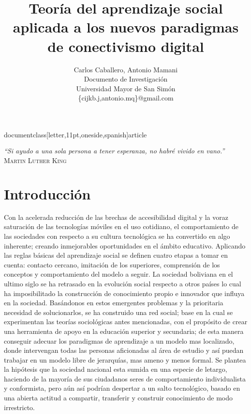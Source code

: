 documentclass[letter,11pt,oneside,spanish]{article}
\usepackage[latin1]{inputenc}
\usepackage[spanish]{babel}
\usepackage{graphicx}
\usepackage{float}
\usepackage{hyperref}
\usepackage{anysize}
\renewcommand{\rmdefault}{phv} %
\renewcommand{\sfdefault}{phv} %

\marginsize{2.5cm}{2.5cm}{2.5cm}{2.5cm}
\renewcommand{\baselinestretch}{1.5}


\title{\textbf{Teor\'ia del aprendizaje social aplicada a los nuevos paradigmas de conectivismo digital}}
\author{Carlos Caballero, Antonio Mamani\\
        Documento de Investigaci\'on\\
        Universidad Mayor de San Sim\'on\\
	\{cijkb.j,antonio.mq\}@gmail.com\\}
\date{}


\newpage
\thispagestyle{empty}
\begin{flushright}
\textit{``Si ayudo a una sola persona a tener esperanza, no habr\'e vivido en vano.''}\\
\textsc{Martin Luther King}
\end{flushright}


\newpage
\section{Introducci\'on}
Con la acelerada reducci\'on de las brechas de accesibilidad digital y la voraz saturaci\'on de las tecnolog\'ias m\'oviles en el
uso cotidiano, el comportamiento de las sociedades con respecto a su cultura tecnol\'ogica se ha convertido en algo inherente;
creando inmejorables oportunidades en el \'ambito educativo. Aplicando las reglas b\'asicas del aprendizaje social se definen 
cuatro etapas a tomar en cuenta: contacto cercano, imitaci\'on de los superiores, comprensi\'on de los conceptos y comportamiento
del modelo a seguir. La sociedad boliviana en el ultimo siglo se ha retrasado en la evoluci\'on social respecto a otros pa\'ises
lo cual ha imposibilitado la construcci\'on de conocimiento propio e innovador que influya en la sociedad. Bas\'andonos en estos
emergentes problemas y la prioritaria necesidad de solucionarlos, se ha construido una red social; base en la cual se 
experimentan las teor\'ias sociol\'ogicas antes mencionadas, con el prop\'osito de crear una herramienta de apoyo en la educaci\'on
superior y secundaria; de esta manera conseguir adecuar los paradigmas de aprendizaje a un modelo mas localizado, donde 
intervengan todas las personas aficionadas al \'area de estudio y as\'i puedan trabajar en un modelo libre de jerarqu\'ias, mas 
ameno y menos formal.
Se plantea la hip\'otesis que la sociedad nacional esta sumida en una especie de letargo, haciendo de la mayor\'ia de sus 
ciudadanos seres de comportamiento individualista y conformista, pero a\'un as\'i podr\'ian despertar a un salto tecnol\'ogico, 
basado en una abierta actitud a compartir, transferir y construir conocimiento de modo irrestricto.

